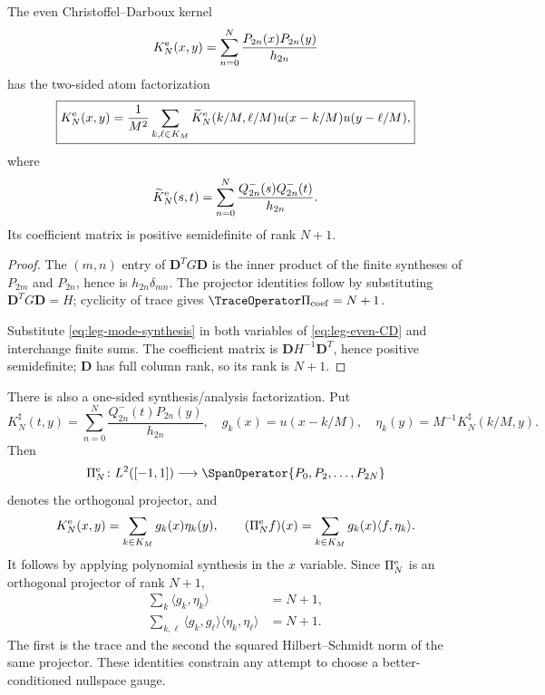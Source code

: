 {\begin{theorem}
The even Christoffel--Darboux kernel
\begin{equation}
 K_N^{\rm e}(x,y)=
 \sum_{n=0}^{N}\frac{P_{2n}(x)P_{2n}(y)}{h_{2n}}
 \label{eq:leg-even-CD}
\end{equation}
has the two-sided atom factorization
\begin{equation}
 \boxed{
 K_N^{\rm e}(x,y)=\frac1{M^2}
 \sum_{k,\ell\in K_M}
 \widetilde K_N^{\rm e}(k/M,\ell/M)
 u(x-k/M)u(y-\ell/M),}
 \label{eq:leg-two-sided-CD}
\end{equation}
where
\[
 \widetilde K_N^{\rm e}(s,t)
 =\sum_{n=0}^{N}\frac{Q_{2n}^-(s)Q_{2n}^-(t)}{h_{2n}}.
\]
Its coefficient matrix is positive semidefinite of rank $N+1$.
\end{theorem}

\begin{proof}
The $(m,n)$ entry of $\mathbf D^TG\mathbf D$ is the inner product of the finite syntheses of
$P_{2m}$ and $P_{2n}$, hence is $h_{2n}\delta_{mn}$.  The projector
identities follow by substituting $\mathbf D^TG\mathbf D=H$; cyclicity of trace gives
$\TraceOperator\Pi_{\rm coef}=N+1$.

Substitute \eqref{eq:leg-mode-synthesis} in both variables of
\eqref{eq:leg-even-CD} and interchange finite sums.  The coefficient matrix
is $\mathbf D H^{-1}\mathbf D^T$, hence positive semidefinite;
$\mathbf D$ has full column rank, so its
rank is $N+1$.
\end{proof}

There is also a one-sided synthesis/analysis factorization.  Put
\[
 K_N^\sharp(t,y)
 =\sum_{n=0}^{N}\frac{Q_{2n}^-(t)P_{2n}(y)}{h_{2n}},
\quad
 g_k(x)=u(x-k/M),\quad
 \eta_k(y)=M^{-1}K_N^\sharp(k/M,y).
\]
Then
\[
 \Pi_N^{\rm e}\colon L^2([-1,1])\longrightarrow
 \SpanOperator\{P_0,P_2,\ldots,P_{2N}\}
\]
denotes the orthogonal projector, and
\begin{equation}
 K_N^{\rm e}(x,y)=\sum_{k\in K_M}g_k(x)\eta_k(y),
 \qquad
 (\Pi_N^{\rm e}f)(x)=\sum_{k\in K_M}g_k(x)\langle f,\eta_k\rangle.
 \label{eq:leg-one-sided-frame}
\end{equation}
It follows by applying polynomial synthesis in the $x$ variable.  Since
$\Pi_N^{\rm e}$ is an orthogonal projector of rank $N+1$,
\begin{align}
 \sum_k\langle g_k,\eta_k\rangle&=N+1,
 \label{eq:leg-frame-trace}\\
 \sum_{k,\ell}\langle g_k,g_\ell\rangle
 \langle\eta_k,\eta_\ell\rangle&=N+1.
 \label{eq:leg-frame-HS}
\end{align}
The first is the trace and the second the squared Hilbert--Schmidt norm of
the same projector.  These identities constrain any attempt to choose a
better-conditioned nullspace gauge.

}
